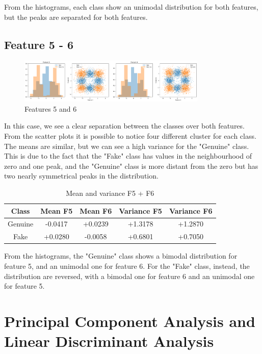 \documentclass[12pt, a4paper]{article}
\begin{document}
From the histograms, each class show an unimodal distribution for both features, but the peaks are separated for both features.

\subsection{Feature 5 - 6}

\begin{figure}[ht]
	\centering
	\includegraphics[width=0.8\textwidth]{features_5_6}
	\caption{Features 5 and 6}
	\label{fig:features5_6}
\end{figure}

In this case, we see a clear separation between the classes over both features. From the scatter plots it is possible to notice four different cluster for each class.\\
The means are similar, but we can see a high variance for the "Genuine" class. This is due to the fact that the "Fake" class has values in the neighbourhood of zero and one peak, and the "Genuine" class is more distant from the zero but has two nearly symmetrical peaks in the distribution.

\begin{table}[ht!]
	\centering
 	\begin{tabular}{| | c c c c c | |} 
 		\hline
 		Class & Mean F5 & Mean F6 & Variance F5 & Variance F6\\
 		\hline\hline
 		Genuine & -0.0417 & +0.0239 & +1.3178 & +1.2870\\
 		\hline
 		Fake    & +0.0280 & -0.0058 & +0.6801 & +0.7050\\
 		\hline
 	\end{tabular}
	\caption{Mean and variance F5 + F6}
\end{table}

From the histograms, the "Genuine" class shows a bimodal distribution for feature 5, and an unimodal one for feature 6. For the "Fake" class, instead, the distribution are reversed, with a bimodal one for feature 6 and an unimodal one for feature 5.

\clearpage
\section{Principal Component Analysis and Linear Discriminant Analysis}
\end{document}
